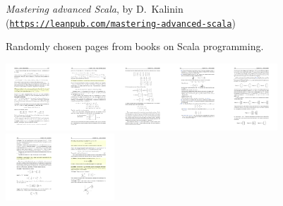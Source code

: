 \begin{figure}
\begin{centering}
\emph{Mastering advanced Scala}, by D.~Kalinin (\texttt{\small{}\href{https://leanpub.com/mastering-advanced-scala}{https://leanpub.com/mastering-advanced-scala}})
\par\end{centering}
\caption{Randomly chosen pages from books on Scala programming.\label{fig:Randomly-chosen-pages-1}}
\end{figure}

\begin{figure}
\begin{centering}
\includegraphics[height=2.51cm]{random-pages/random-pages-from-hefferon-pdf-00}\includegraphics[height=2.51cm]{random-pages/random-pages-from-hefferon-pdf-01}\includegraphics[height=2.51cm]{random-pages/random-pages-from-hefferon-pdf-03}\includegraphics[height=2.51cm]{random-pages/random-pages-from-hefferon-pdf-04}\includegraphics[height=2.51cm]{random-pages/random-pages-from-hefferon-pdf-05}\includegraphics[height=2.51cm]{random-pages/random-pages-from-hefferon-pdf-06}\includegraphics[height=2.51cm]{random-pages/random-pages-from-hefferon-pdf-07}

\end{centering}
\end{figure}
